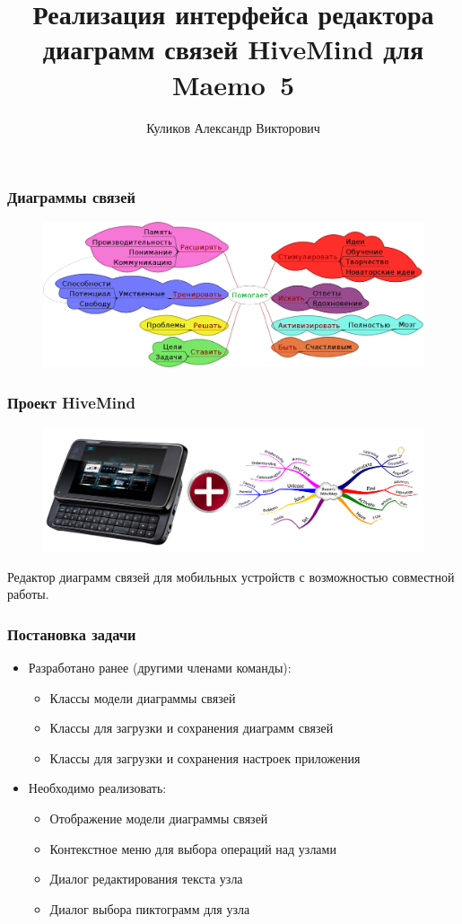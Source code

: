 \documentclass[unicode]{beamer}
\title[Реализация интерфейса приложения HiveMind]{
Реализация интерфейса редактора диаграмм связей HiveMind для Maemo~5
}
\author[Куликов А.\,В.]{Куликов Александр Викторович}
\institute{
Научный руководитель: ст. преподаватель Парамонов~И.\,В.
}
\date{}
\begin{document}
\maketitle
\large

\begin{frame}
\transwipe[direction=90]
\frametitle{Диаграммы связей}
\begin{figure}[h!] 
\centering
\includegraphics[width=\linewidth]{mind-map} 
\end{figure}
\end{frame}

\begin{frame}
\transwipe[direction=90]
\frametitle{Проект HiveMind}
\begin{figure}[h!] 
\centering 
\includegraphics[width=\linewidth]{crossing} 
\end{figure}
Редактор диаграмм связей для мобильных устройств с возможностью совместной работы.
\end{frame}

\begin{frame}
\transwipe[direction=90]
\frametitle{Постановка задачи}
\begin{itemize}
\item Разработано ранее (другими членами команды):
\begin{itemize}
\item
Классы модели диаграммы связей
\item
Классы для загрузки и сохранения диаграмм связей
\item
Классы для загрузки и сохранения настроек приложения
\end{itemize}
\item
Необходимо реализовать:
\begin{itemize}
\item 
Отображение модели диаграммы связей
\item
Контекстное меню для выбора операций над узлами
\item
Диалог редактирования текста узла
\item
Диалог выбора пиктограмм для узла
\end{itemize}
\end{itemize}
\end{frame}
\end{document}
